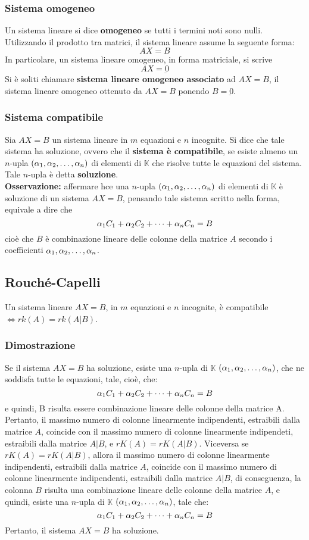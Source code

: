 \documentclass[../main.tex]{subfiles}
\begin{document}
\subsubsection{Sistema omogeneo}
Un sistema lineare si dice \textbf{omogeneo} se tutti i termini noti sono
nulli. Utilizzando il prodotto tra matrici, il sistema lineare assume la
seguente forma:
\[
    AX = B
\]
In particolare, un sistema lineare omogeneo, in forma matriciale, si scrive
\[
    AX = \underbar{0}
\]
Si è soliti chiamare \textbf{sistema lineare omogeneo associato} ad $AX = B$,
il sistema lineare omogeneo ottenuto da $AX = B$ ponendo $B = \underbar{0}$.

\subsubsection{Sistema compatibile}
Sia $AX = B$ un sistema lineare in $m$ equazioni e $n$ incognite. Si dice che
tale sistema ha soluzione, ovvero che il \textbf{sistema è compatibile}, se
esiste almeno un $n$-upla $ (\alpha_1, \alpha_2, \ldots, \alpha_{n})$ di elementi di $\mathbb{K}$ che
risolve tutte le equazioni del sistema. Tale $n$-upla è detta
\textbf{soluzione}.\\ \textbf{Osservazione:} affermare hce una $n$-upla $
    (\alpha_1, \alpha_2, \ldots, \alpha_{n})$ di elementi di $\mathbb{K}$ è soluzione di un sistema $AX = B$,
pensando tale sistema scritto nella forma, equivale a dire che
\[
    \alpha_1C_1 + \alpha_2C_2 + \cdots + \alpha_nC_n = B
\]
cioè che $B$ è combinazione lineare delle colonne della matrice $A$ secondo i
coefficienti $\alpha_1, \alpha_2, \ldots, \alpha_n$.

\subsection{Rouché-Capelli}
Un sistema lineare $AX = B$, in $m$ equazioni e $n$ incognite, è compatibile
$\iff rk (A) = rk (A|B)$.

\subsubsection{Dimostrazione}
Se il sistema $AX = B$ ha soluzione, esiste una $n$-upla di $\mathbb{K}$ $
    (\alpha_1, \alpha_2, \ldots, \alpha_{n})$, che ne soddisfa tutte le equazioni, tale, cioè, che:
\[
    \alpha_1C_1 + \alpha_2C_2 + \cdots + \alpha_nC_n = B
\]
e quindi, B risulta essere combinazione lineare delle colonne della matrice A.
Pertanto, il massimo numero di colonne linearmente indipendenti, estraibili
dalla matrice $A$, coincide con il massimo numero di colonne linearmente
indipendeti, estraibili dalla matrice $A|B$, e $rK (A) = rK (A|B)$. Viceversa
se $rK (A) = rK (A|B)$, allora il massimo numero di colonne linearmente
indipendenti, estraibili dalla matrice $A$, coincide con il massimo numero di
colonne linearmente indipendenti, estraibili dalla matrice $A|B$, di
conseguenza, la colonna $B$ risulta una combinazione lineare delle colonne
della matrice $A$, e quindi, esiste una $n$-upla di $\mathbb{K}$ $
    (\alpha_1, \alpha_2, \ldots, \alpha_{n})$, tale che:
\[
    \alpha_1C_1+\alpha_2C_2+\cdots+\alpha_nC_n = B
\]
Pertanto, il sistema $AX = B$ ha soluzione.
\end{document}

